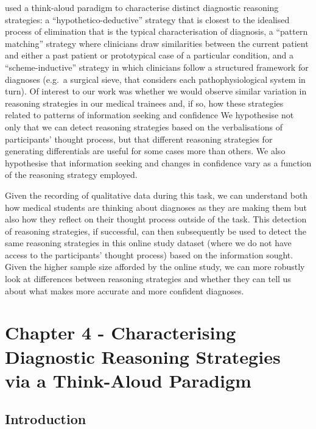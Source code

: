 \documentclass[a4paper, nobind]{templates/ociamthesis}
\begin{document}
\hfill\break
\textcite{coderre_diagnostic_2003} used a think-aloud paradigm to characterise distinct diagnostic reasoning strategies: a ``hypothetico-deductive'' strategy that is closest to the idealised process of elimination that is the typical characterisation of diagnosis, a ``pattern matching'' strategy where clinicians draw similarities between the current patient and either a past patient or prototypical case of a particular condition, and a ``scheme-inductive'' strategy in which clinicians follow a structured framework for diagnoses (e.g.~a surgical sieve, that considers each pathophysiological system in turn). Of interest to our work was whether we would observe similar variation in reasoning strategies in our medical trainees and, if so, how these strategies related to patterns of information seeking and confidence We hypothesise not only that we can detect reasoning strategies based on the verbalisations of participants' thought process, but that different reasoning strategies for generating differentials are useful for some cases more than others. We also hypothesise that information seeking and changes in confidence vary as a function of the reasoning strategy employed.

\hfill\break
Given the recording of qualitative data during this task, we can understand both how medical students are thinking about diagnoses as they are making them but also how they reflect on their thought process outside of the task. This detection of reasoning strategies, if successful, can then subsequently be used to detect the same reasoning strategies in this online study dataset (where we do not have access to the participants' thought process) based on the information sought. Given the higher sample size afforded by the online study, we can more robustly look at differences between reasoning strategies and whether they can tell us about what makes more accurate and more confident diagnoses.

\chapter{Chapter 4 - Characterising Diagnostic Reasoning Strategies via a Think-Aloud Paradigm}\label{chapter-4}

\adjustmtc
{}

\section{Introduction}\label{introduction-2}
\end{document}
